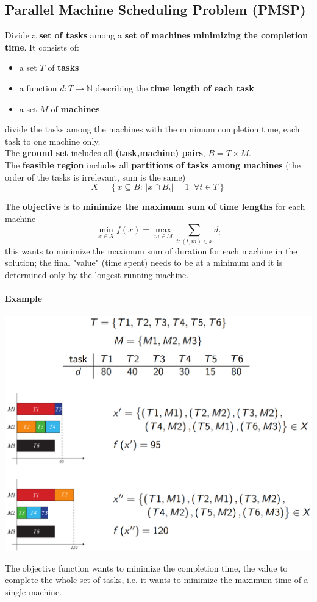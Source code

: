 \documentclass[11pt]{article}
\begin{document}
	\newpage
	
	\subsection{Parallel Machine Scheduling Problem (PMSP)}
	Divide a \textbf{set of tasks} among a \textbf{set of machines} \textbf{minimizing the completion time}. It consists of: 
	\begin{itemize}
		\item a set $T$ of \textbf{tasks}
		\item a function $d : T \rightarrow \mathbb{N}$ describing the \textbf{time length of each task}
		\item a set $M$ of \textbf{machines}
	\end{itemize}
	divide the tasks among the machines with the minimum completion time, each task to one machine only.\\
	
	The \textbf{ground set} includes all \textbf{(task,machine) pairs}, $B = T \times M$.\\
	
	The \textbf{feasible region} includes all \textbf{partitions of tasks among machines} (the order of the tasks is irrelevant, sum is the same)
	$$ X = \left\{x \subseteq B : \, |x \cap B_t| = 1 \;\; \forall t \in T \right\}$$
	
	The \textbf{objective} is to \textbf{minimize the maximum sum of time lengths} for each machine
	$$ \min_{x \in X} f(x) = \max_{m \in M} \sum_{t:(t,m) \in x} d_t $$
	this wants to minimize the maximum sum of duration for each machine in the solution; the final "value" (time spent) needs to be at a minimum and it is determined only by the longest-running machine.

	\newpage

	\paragraph{Example}
	\begin{center}
		\includegraphics[width=\columnwidth]{img/PMSP}
	\end{center}
	The objective function wants to minimize the completion time, the value to complete the whole set of tasks, i.e. it wants to minimize the maximum time of a single machine.
	
\end{document}
